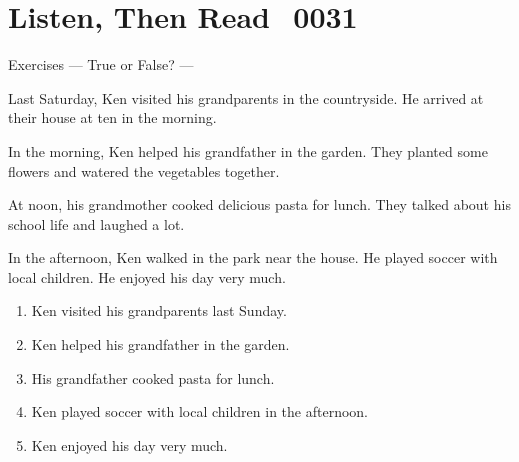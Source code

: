 \documentclass[aspectratio=169,xcolor={dvipsnames,table}]{beamer}
\newcommand{\myaudio}[1]{\href{#1}{\faVolumeUp}}
\begin{document}
\section{Listen, Then Read\,\,\,\,\,{\tiny 0031}\,{\scriptsize \myaudio{./audio/025_past_do_reading.mp3}}}
\begin{frame}[plain,t]{Exercises --- True or False? --- }
\vspace*{-6pt}
\begin{tcolorbox}[colframe=ForestGreen,
  colback=NavyBlue!10!white,
  colbacktitle=NavyBlue!40!white,
  coltitle=black, %
before upper={\setlength{\parindent}{1.25em}},
 title={A Busy Saturday\hfill{\tiny 0034}\quad{\scriptsize \myaudio{./audio/025_past_do_reading.mp3}}}
]
Last Saturday, Ken visited his grandparents in the countryside. He arrived at their house at ten in the morning.

In the morning, Ken helped his grandfather in the garden. They planted some flowers and watered the vegetables together.

At noon, his grandmother cooked delicious pasta for lunch. They talked about his school life and laughed a lot.

In the afternoon, Ken walked in the park near the house. He played soccer with local children. He enjoyed his day very much.
\end{tcolorbox}

\vspace{-5pt}
\begin{enumerate}\small\setlength{\itemsep}{-3.5pt}
\item<2-> Ken visited his grandparents last Sunday.\hfill{}
\item<2-> Ken helped his grandfather in the garden.\hfill{}
\item<2-> His grandfather cooked pasta for lunch.\hfill{}
\item<2-> Ken played soccer with local children in the afternoon.\hfill\visible<6->{T}
\item<2-> Ken enjoyed his day very much.\hfill{}
\end{enumerate}
\end{frame}
\end{document}
